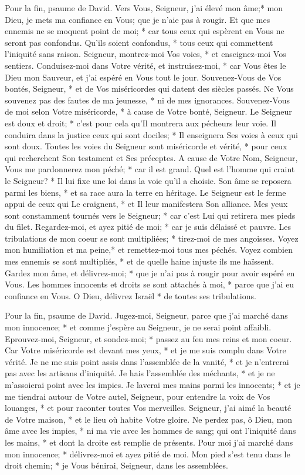 Pour la fin, psaume de David. Vers Vous, Seigneur, j'ai élevé mon âme;*
mon Dieu, je mets ma confiance en Vous; que je n'aie pas à rougir.
Et que mes ennemis ne se moquent point de moi; * car tous ceux qui espèrent en Vous ne seront pas confondus.
Qu'ils soient confondus, * tous ceux qui commettent l'iniquité sans raison. Seigneur, montrez-moi Vos voies, * et enseignez-moi Vos sentiers.
Conduisez-moi dans Votre vérité, et instruisez-moi, * car Vous êtes le Dieu mon Sauveur, et j'ai espéré en Vous tout le jour.
Souvenez-Vous de Vos bontés, Seigneur, * et de Vos miséricordes qui datent des siècles passés.
Ne Vous souvenez pas des fautes de ma jeunesse, * ni de mes ignorances. Souvenez-Vous de moi selon Votre miséricorde, * à cause de Votre bonté, Seigneur.
Le Seigneur est doux et droit; * c'est pour cela qu'Il montrera aux pécheurs leur voie.
Il conduira dans la justice ceux qui sont dociles; * Il enseignera Ses voies à ceux qui sont doux.
Toutes les voies du Seigneur sont miséricorde et vérité, * pour ceux qui recherchent Son testament et Ses préceptes.
A cause de Votre Nom, Seigneur, Vous me pardonnerez mon péché; * car il est grand.
Quel est l'homme qui craint le Seigneur? * Il lui fixe une loi dans la voie qu'il a choisie.
Son âme se reposera parmi les biens, * et sa race aura la terre en héritage.
Le Seigneur est le ferme appui de ceux qui Le craignent, * et Il leur manifestera Son alliance.
Mes yeux sont constamment tournés vers le Seigneur; * car c'est Lui qui retirera mes pieds du filet.
Regardez-moi, et ayez pitié de moi; * car je suis délaissé et pauvre.
Les tribulations de mon coeur se sont multipliées; * tirez-moi de mes angoisses.
Voyez mon humiliation et ma peine,* et remettez-moi tous mes péchés.
Voyez combien mes ennemis se sont multipliés, * et de quelle haine injuste ils me haïssent.
Gardez mon âme, et délivrez-moi; * que je n'ai pas à rougir pour avoir espéré en Vous.
Les hommes innocents et droits se sont attachés à moi, * parce que j'ai eu confiance en Vous.
O Dieu, délivrez Israël * de toutes ses tribulations.

Pour la fin, psaume de David. Jugez-moi, Seigneur, parce que j'ai marché dans mon innocence; * et comme j'espère au Seigneur, je ne serai point affaibli.
Eprouvez-moi, Seigneur, et sondez-moi; * passez au feu mes reins et mon coeur.
Car Votre miséricorde est devant mes yeux, * et je me suis complu dans Votre vérité.
Je ne me suis point assis dans l'assemblée de la vanité, * et je n'entrerai pas avec les artisans d'iniquité.
Je hais l'assemblée des méchants, * et je ne m'assoierai point avec les impies.
Je laverai mes mains parmi les innocents; * et je me tiendrai autour de Votre autel, Seigneur,
pour entendre la voix de Vos louanges, * et pour raconter toutes Vos merveilles.
Seigneur, j'ai aimé la beauté de Votre maison, * et le lieu où habite Votre gloire.
Ne perdez pas, ô Dieu, mon âme avec les impies, * ni ma vie avec les hommes de sang;
qui ont l'iniquité dans les mains, * et dont la droite est remplie de présents.
Pour moi j'ai marché dans mon innocence; * délivrez-moi et ayez pitié de moi.
Mon pied s'est tenu dans le droit chemin; * je Vous bénirai, Seigneur, dans les assemblées.

